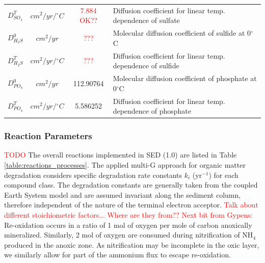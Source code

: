 \documentclass[gmd, manuscript]{copernicus}
\begin{document}
\begin{table}[hbtp]
\begin{tabular}{l c c l}
$D_{SO_4}^T$ & $cm^2/yr/{}^{\circ}C$ & \textcolor{red}{7.884 OK??} &Diffusion coefficient for linear temp. dependence of sulfate\\ %
$D_{H_2S}^0$ & $cm^2/yr$ & \textcolor{red}{???} &Molecular diffusion coefficient of sulfide at 0$^\circ$C\\
$D_{H_2S}^T$ & $cm^2/yr/{}^{\circ}C$ & \textcolor{red}{???} &Diffusion coefficient for linear temp. dependence of sulfide\\ %
$D_{PO_4}^0$ & $cm^2/yr$ & 112.90764 &Molecular diffusion coefficient of phosphate at 0$^\circ$C\\
$D_{PO_4}^T$ & $cm^2/yr/{}^{\circ}C$ & 5.586252 &Diffusion coefficient for linear temp. dependence of phosphate\\ %
\hline\hline
\end{tabular}
\label{table:sed-charac_transport-parameters}
\end{table}


\subsubsection {Reaction Parameters}
\textcolor{red}{TODO}
The overall reactions implemented in SED (1.0) are listed in Table \ref{table:reactions_processes}. 
The applied multi-G approach for organic matter degradation considers specific degradation rate constants $k_i$ (yr$^{-1}$) for each compound class. The degradation constants are generally taken from the coupled Earth System model 
and are assumed invariant along the sediment column, therefore independent of the nature of the terminal electron acceptor. \textcolor{red}{ Talk about different stoichiometric factors... Where are they from??}
\textcolor{red}{Next bit from Gypens:} Re-oxidation occurs in a ratio of 1 mol of oxygen per mole of carbon anoxically mineralized. Similarly, 2 mol of oxygen
are consumed during nitrification of NH$_4$ produced in the anoxic zone. As nitrification may be incomplete in the oxic layer, we similarly allow for part of the ammonium flux to escape re-oxidation. 
\end{document}
